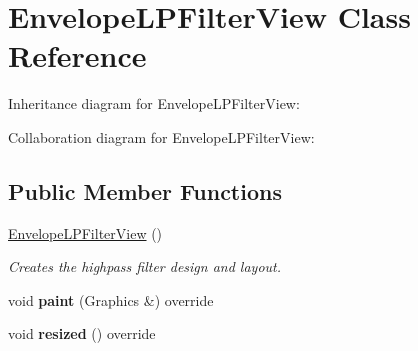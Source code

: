 \hypertarget{class_envelope_l_p_filter_view}{}\section{Envelope\+L\+P\+Filter\+View Class Reference}
\label{class_envelope_l_p_filter_view}


Inheritance diagram for Envelope\+L\+P\+Filter\+View\+:


Collaboration diagram for Envelope\+L\+P\+Filter\+View\+:
\subsection*{Public Member Functions}
\begin{DoxyCompactItemize}
\item 
\hyperlink{class_envelope_l_p_filter_view_a0a8f20e22064997ff8e5ebc45a7f2a40}{Envelope\+L\+P\+Filter\+View} ()\hypertarget{class_envelope_l_p_filter_view_a0a8f20e22064997ff8e5ebc45a7f2a40}{}\label{class_envelope_l_p_filter_view_a0a8f20e22064997ff8e5ebc45a7f2a40}

\begin{DoxyCompactList}\small\item\em Creates the highpass filter design and layout. \end{DoxyCompactList}\item 
void {\bfseries paint} (Graphics \&) override\hypertarget{class_envelope_l_p_filter_view_a09668fec6ce5244229a59a7374a07ac8}{}\label{class_envelope_l_p_filter_view_a09668fec6ce5244229a59a7374a07ac8}

\item 
void {\bfseries resized} () override\hypertarget{class_envelope_l_p_filter_view_acc307ea01dfa3cd39c4ecdafa1eb3344}{}\label{class_envelope_l_p_filter_view_acc307ea01dfa3cd39c4ecdafa1eb3344}

\end{DoxyCompactItemize}
